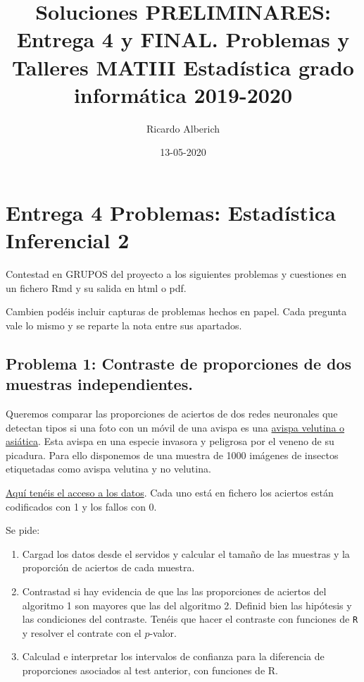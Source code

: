 \documentclass[
]{article}
\title{Soluciones PRELIMINARES: Entrega 4 y FINAL. Problemas y Talleres MATIII
Estadística grado informática 2019-2020}
\author{Ricardo Alberich}
\date{13-05-2020}
\providecommand{\tightlist}{%
  \setlength{\itemsep}{0pt}\setlength{\parskip}{0pt}}
\begin{document}
\maketitle

{
\hypersetup{linkcolor=blue}
\setcounter{tocdepth}{4}
\tableofcontents
}
\hypertarget{entrega-4-problemas-estaduxedstica-inferencial-2}{%
\section{Entrega 4 Problemas: Estadística Inferencial
2}\label{entrega-4-problemas-estaduxedstica-inferencial-2}}

Contestad en GRUPOS del proyecto a los siguientes problemas y cuestiones
en un fichero Rmd y su salida en html o pdf.

Cambien podéis incluir capturas de problemas hechos en papel. Cada
pregunta vale lo mismo y se reparte la nota entre sus apartados.

\hypertarget{problema-1-contraste-de-proporciones-de-dos-muestras-independientes.}{%
\subsection{Problema 1: Contraste de proporciones de dos muestras
independientes.}\label{problema-1-contraste-de-proporciones-de-dos-muestras-independientes.}}

Queremos comparar las proporciones de aciertos de dos redes neuronales
que detectan tipos si una foto con un móvil de una avispa es una
\href{https://es.wikipedia.org/wiki/Vespa_velutina}{avispa velutina o
asiática}. Esta avispa en una especie invasora y peligrosa por el veneno
de su picadura. Para ello disponemos de una muestra de 1000 imágenes de
insectos etiquetadas como avispa velutina y no velutina.

\href{http://bioinfo.uib.es/~recerca/MATIIIGINF/velutina}{Aquí tenéis el
acceso a los datos}. Cada uno está en fichero los aciertos están
codificados con 1 y los fallos con 0.

Se pide:

\begin{enumerate}
\def\labelenumi{\arabic{enumi}.}
\tightlist
\item
  Cargad los datos desde el servidos y calcular el tamaño de las
  muestras y la proporción de aciertos de cada muestra.
\item
  Contrastad si hay evidencia de que las las proporciones de aciertos
  del algoritmo 1 son mayores que las del algoritmo 2. Definid bien las
  hipótesis y las condiciones del contraste. Tenéis que hacer el
  contraste con funciones de \texttt{R} y resolver el contrate con el
  \(p\)-valor.
\item
  Calculad e interpretar los intervalos de confianza para la diferencia
  de proporciones asociados al test anterior, con funciones de R.
\end{enumerate}
\end{document}
